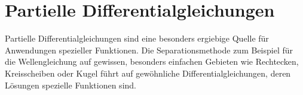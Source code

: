 %
%
%
\chapter{Partielle Differentialgleichungen
\label{buch:chapter:pde}}
\rhead{}
Partielle Differentialgleichungen sind eine besonders ergiebige
Quelle für Anwendungen spezieller Funktionen.
Die Separationsmethode zum Beispiel für die Wellengleichung
auf gewissen, besonders einfachen Gebieten wie Rechtecken,
Kreisscheiben oder Kugel führt auf gewöhnliche Differentialgleichungen,
deren Lösungen spezielle Funktionen sind.








